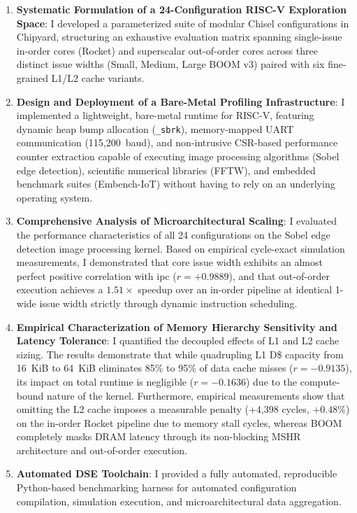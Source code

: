 \begin{enumerate}
    \item \textbf{Systematic Formulation of a 24-Configuration RISC-V Exploration Space}: I developed a parameterized suite of modular Chisel configurations in Chipyard,
      structuring an exhaustive evaluation matrix spanning single-issue in-order cores (Rocket) 
      and superscalar out-of-order cores across three distinct issue widths (Small, Medium, Large BOOM v3) paired with six fine-grained L1/L2 cache variants.
    \item \textbf{Design and Deployment of a Bare-Metal Profiling Infrastructure}: I implemented a lightweight, bare-metal runtime for RISC-V,
      featuring dynamic heap bump allocation (\texttt{\_sbrk}), memory-mapped UART communication (115,200~baud), 
      and non-intrusive CSR-based performance counter extraction capable of executing image processing algorithms (Sobel edge detection), scientific numerical libraries (FFTW), and embedded benchmark suites (Embench-IoT) without having to rely on an underlying operating system.
    \item \textbf{Comprehensive Analysis of Microarchitectural Scaling}: I evaluated the performance characteristics of all 24 configurations 
      on the Sobel edge detection image processing kernel. Based on empirical cycle-exact simulation measurements, I demonstrated that core issue width exhibits an almost perfect positive correlation with \gls{ipc} ($r = +0.9889$), 
      and that out-of-order execution achieves a $1.51\times$ speedup over an in-order pipeline at identical 1-wide issue width strictly through dynamic instruction scheduling.
    \item \textbf{Empirical Characterization of Memory Hierarchy Sensitivity and Latency Tolerance}: I quantified the decoupled effects of L1 and L2 cache sizing. 
      The results demonstrate that while quadrupling L1 D\$ capacity from 16~KiB to 64~KiB eliminates 85\% to 95\% of data cache misses ($r = -0.9135$), 
      its impact on total runtime is negligible ($r = -0.1636$) due to the compute-bound nature of the kernel. 
      Furthermore, empirical measurements show that omitting the L2 cache imposes a measurable penalty (+4,398 cycles, $+0.48\%$) on the in-order Rocket pipeline due to memory stall cycles, 
      whereas BOOM completely masks DRAM latency through its non-blocking MSHR architecture and out-of-order execution.
    \item \textbf{Automated DSE Toolchain}: I provided a fully automated, reproducible Python-based benchmarking harness for automated configuration compilation, simulation execution, and microarchitectural data aggregation.
\end{enumerate}

